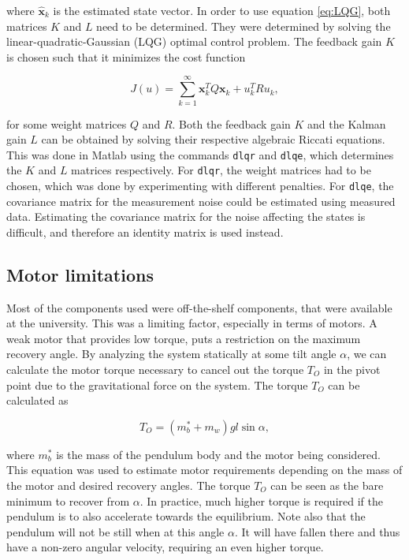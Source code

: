 \noindent
where $\hat{\mathbf{x}}_k$ is the estimated state vector. In order to use equation \eqref{eq:LQG}, both matrices $K$ and $L$ need to be determined. They were determined by solving the linear-quadratic-Gaussian (LQG) optimal control problem. The feedback gain $K$ is chosen such that it minimizes the cost function

\begin{equation}\label{eq:LQG-cost}
    J(u) = \sum_{k=1}^\infty \mathbf{x}_k^T Q \mathbf{x}_k + u_k^T R u_k,
\end{equation}

\noindent
for some weight matrices $Q$ and $R$. Both the feedback gain $K$ and the Kalman gain $L$ can be obtained by solving their respective algebraic Riccati equations. This was done in Matlab using the commands \texttt{dlqr} and \texttt{dlqe}, which determines the $K$ and $L$ matrices respectively. For \texttt{dlqr}, the weight matrices had to be chosen, which was done by experimenting with different penalties. For \texttt{dlqe}, the covariance matrix for the measurement noise could be estimated using measured data. Estimating the covariance matrix for the noise affecting the states is difficult, and therefore an identity matrix is used instead.

\subsection{Motor limitations}
Most of the components used were off-the-shelf components, that were available at the university. This was a limiting factor, especially in terms of motors. A weak motor that provides low torque, puts a restriction on the maximum recovery angle. By analyzing the system statically at some tilt angle $\alpha$, we can calculate the motor torque necessary to cancel out the torque $T_O$ in the pivot point due to the gravitational force on the system. The torque $T_O$ can be calculated as

\begin{equation}\label{eq:tau}
    T_O = (m_b^*+m_w)gl \sin \alpha,
\end{equation}

\noindent
where $m_b^*$ is the mass of the pendulum body and the motor being considered. This equation was used to estimate motor requirements depending on the mass of the motor and desired recovery angles. The torque $T_O$ can be seen as the bare minimum to recover from $\alpha$. In practice, much higher torque is required if the pendulum is to also accelerate towards the equilibrium. Note also that the pendulum will not be still when at this angle $\alpha$. It will have fallen there and thus have a non-zero angular velocity, requiring an even higher torque.

